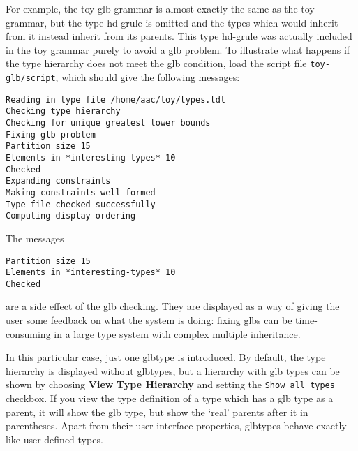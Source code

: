 \documentclass[12pt]{report}
\newcommand{\filename}[1]{{\tt #1}}
\newcommand{\lkbmenucommand}{\bf}
\begin{document}
For example, the toy-glb
grammar is almost exactly the same as the toy grammar, but the
type {\type hd-grule} is omitted and the types which would inherit
from it instead inherit from its parents.  This type {\type hd-grule}
was actually included in the toy grammar purely to
avoid a glb problem.  To illustrate what happens if the type hierarchy does not
meet the glb condition,
load the script file \filename{toy-glb/script}, which should give the following
messages:
\begin{verbatim}
Reading in type file /home/aac/toy/types.tdl
Checking type hierarchy
Checking for unique greatest lower bounds
Fixing glb problem
Partition size 15
Elements in *interesting-types* 10
Checked
Expanding constraints
Making constraints well formed
Type file checked successfully
Computing display ordering
\end{verbatim}
The messages 
\begin{verbatim}
Partition size 15
Elements in *interesting-types* 10
Checked
\end{verbatim}
are a side effect of the glb checking.  They are displayed as a way
of giving the user some feedback on what the system is doing:
fixing glbs can be time-consuming in a large type system with
complex multiple inheritance.

In this particular case, just one glbtype is introduced.
By default, the type hierarchy is displayed
without glbtypes, but a hierarchy with glb types
can be shown by choosing
{\lkbmenucommand View} {\lkbmenucommand Type Hierarchy} and setting the {\tt Show all types}
checkbox.
If you view the type definition of a type which has a glb type as a parent,
it will show the glb type, but show the `real' parents after it 
in parentheses.
Apart from their user-interface properties, 
glbtypes behave exactly like user-defined types.
\end{document}
